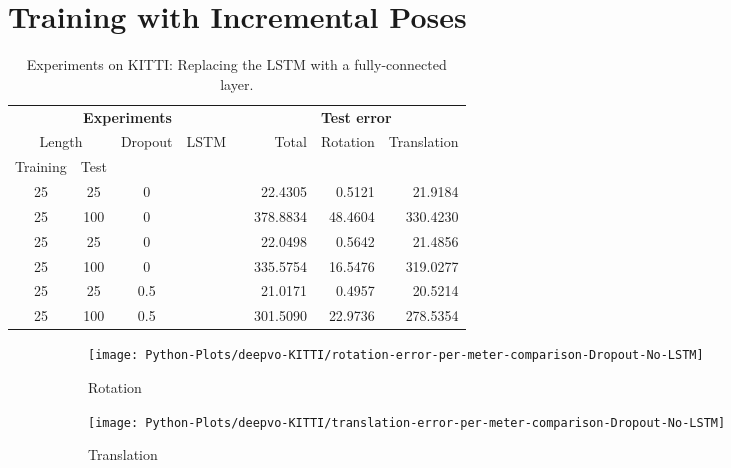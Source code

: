 	\section{Training with Incremental Poses}
		
		\begin{table}[tb]
			\small
			\begin{center}
				\begin{tabular}{cccccrrr}
					\toprule
					\multicolumn{5}{c}{\textbf{Experiments}}		& \multicolumn{3}{c}{\textbf{Test error}} 		\\
					\cmidrule(lr){1-4} 	\cmidrule(lr){6-8}
					\multicolumn{2}{c}{Length} & Dropout & LSTM &	& Total & Rotation & Translation	\\ 
					Training & Test & & & & & & \\
					\midrule
					25 & 25		& 0			& \xmark 	& 	& 22.4305	& 0.5121	& 21.9184		\\ 
					25 & 100	& 0			& \xmark 	& 	& 378.8834	& 48.4604	& 330.4230 		\\ 
					25 & 25		& 0			& \cmark 	& 	& 22.0498	& 0.5642	& 21.4856 		\\ 
					25 & 100	& 0			& \cmark 	& 	& 335.5754	& 16.5476	& 319.0277 		\\ 
					25 & 25		& 0.5		& \cmark 	& 	& 21.0171	& 0.4957	& 20.5214		\\ 
					25 & 100	& 0.5		& \cmark 	& 	& 301.5090	& 22.9736	& 278.5354 		\\ 
					\bottomrule
				\end{tabular}
			\end{center}
			\caption[Experiments on KITTI: Replacing the LSTM with an affine layer]
					{Experiments on KITTI: Replacing the LSTM with a fully-connected layer.
					 \label{tbl:kitti-removing-lstm}}
		\end{table}
		
		\begin{figure}
			\centering
			\begin{subfigure}[b]{0.5\linewidth}
				\centering
				\texttt{[image: Python-Plots/deepvo-KITTI/rotation-error-per-meter-comparison-Dropout-No-LSTM]}
				\caption{
					Rotation
					\label{fig:avg-rotation-error-dropout-no-LSTM}
				}
			\end{subfigure}%
			\begin{subfigure}[b]{0.5\linewidth}
				\centering
				\texttt{[image: Python-Plots/deepvo-KITTI/translation-error-per-meter-comparison-Dropout-No-LSTM]}
				\caption{
					Translation
					\label{fig:avg-translation-error-dropout-no-LSTM}
				}
			\end{subfigure}%
			\caption[Average rotation- and translation error]
					{\label{fig:avg-rotation-and-translation-error-dropout-no-LSTM}}
		\end{figure}
		
